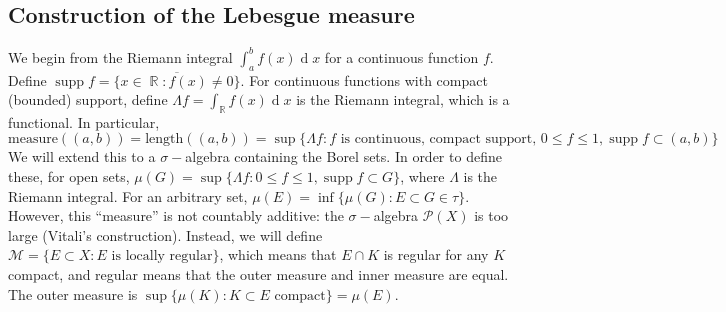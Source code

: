 \documentclass[12pt, a4paper]{book}
\DeclareMathOperator{\R}{\mathbb{R}}
\DeclareMathOperator{\supp}{supp}
\renewcommand{\d}[1]{\ensuremath{\operatorname{d}\!{#1}}} %
\theoremstyle{nonumberplain}
\begin{document}
\subsection{Construction of the Lebesgue measure}
We begin from the Riemann integral $\int_a^b f(x)\d{x}$ for a continuous function $f$.
Define $\supp f=\overline{\{x\in\R:f(x)\neq 0\}}$.
For continuous functions with compact (bounded) support, define $\Lambda f=\int_{\R} f(x)\d{x}$ is the Riemann integral, which is a functional.
In particular,
\[\text{measure}((a,b))=\text{length}((a,b))=\sup\{\Lambda f:f\text{ is continuous, compact support, }0\leq f\leq 1,\supp f\subset(a,b)\}\]
We will extend this to a $\sigma-$algebra containing the Borel sets.
In order to define these, for open sets, $\mu(G)=\sup\{\Lambda f:0\leq f\leq 1,\supp f\subset G\}$, where $\Lambda$ is the Riemann integral.
For an arbitrary set, $\mu(E)=\inf\{\mu(G):E\subset G\in\tau\}$.
However, this ``measure'' is not countably additive: the $\sigma-$algebra $\mathcal{P}(X)$ is too large (Vitali's construction).
Instead, we will define $\mathcal{M}=\{E\subset X:E\text{ is locally regular}\}$, which means that $E\cap K$ is regular for any $K$ compact, and regular means that the outer measure and inner measure are equal.
The outer measure is $\sup\{\mu(K):K\subset E\text{ compact}\}=\mu(E)$.
\end{document}

